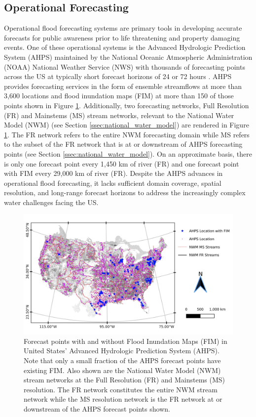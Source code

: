 \documentclass[draft]{dependencies/agujournal2019}
\begin{document}
\subsection{Operational Forecasting}
%
Operational flood forecasting systems are primary tools in developing accurate forecasts for public awareness prior to life threatening and property damaging events. 
One of these operational systems is the Advanced Hydrologic Prediction System (AHPS) maintained by the National Oceanic Atmospheric Administration (NOAA) National Weather Service (NWS) with thousands of forecasting points across the US at typically short forecast horizons of 24 or 72 hours \cite{mcenery2005noaa}.
AHPS provides forecasting services in the form of ensemble streamflows at more than 3,600 locations and flood inundation maps (FIM) at more than 150 of those points shown in Figure \ref{fig:forecast_points}.
Additionally, two forecasting networks, Full Resolution (FR) and Mainstems (MS) stream networks, relevant to the National Water Model (NWM) (see Section \ref{ssec:national_water_model}) are rendered in Figure \ref{fig:forecast_points}.
The FR network refers to the entire NWM forecasting domain while MS refers to the subset of the FR network that is at or downstream of AHPS forecasting points (see Section \ref{ssec:national_water_model}).
On an approximate basis, there is only one forecast point every 1,450 km of river (FR) and one forecast point with FIM every 29,000 km of river (FR).
Despite the AHPS advances in operational flood forecasting, it lacks sufficient domain coverage, spatial resolution, and long-range forecast horizons to address the increasingly complex water challenges facing the US.
%
\begin{figure}[H]
\centering
\includegraphics[scale=1.0]{figures/forecast_points.jpg}
\caption{Forecast points with and without Flood Inundation Maps (FIM) in United States' Advanced Hydrologic Prediction System (AHPS).
Note that only a small fraction of the AHPS forecast points have existing FIM.
Also shown are the National Water Model (NWM) stream networks at the Full Resolution (FR) and Mainstems (MS) resolution.
The FR network constitutes the entire NWM stream network while the MS resolution network is the FR network at or downstream of the AHPS forecast points shown.
}
\label{fig:forecast_points}
\end{figure}
%
\end{document}

